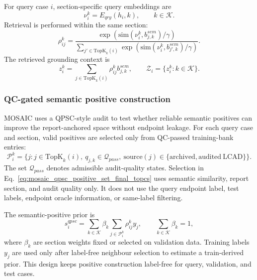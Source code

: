 For query case $i$, section-specific query embeddings are
\begin{equation}
\nu_i^k=E_{qry}(h_i,k),
\qquad k\in\mathcal{K}.
\label{eq:mosaic_query_embedding_final_topcs}
\end{equation}
Retrieval is performed within the same section:
\begin{equation}
\rho_{ij}^{k}
=
\frac{\exp(\mathrm{sim}(\nu_i^k,b_{j,k}^{sem})/\gamma)}
{\sum_{j'\in\mathrm{TopK}_{k}(i)}
\exp(\mathrm{sim}(\nu_i^k,b_{j',k}^{sem})/\gamma)}.
\label{eq:mosaic_retrieval_weights_final_topcs}
\end{equation}
The retrieved grounding context is
\begin{equation}
z_i^k
=
\sum_{j\in\mathrm{TopK}_{k}(i)}
\rho_{ij}^{k}b_{j,k}^{sem},
\qquad
\mathcal{Z}_i=\{z_i^k:k\in\mathcal{K}\}.
\label{eq:mosaic_retrieved_context_final_topcs}
\end{equation}

\subsubsection{QC-gated semantic positive construction}
\label{subsubsec:qpsc_positive_final_topcs}

MOSAIC uses a QPSC-style audit to test whether reliable semantic positives can improve the report-anchored space without endpoint leakage. For each query case and section, valid positives are selected only from QC-passed training-bank entries:
\begin{equation}
\mathcal{P}_{i}^{k}
=
\{j:
j\in\mathrm{TopK}_{k}(i),\
q_{j,k}\in\mathcal{Q}_{pass},\
\mathrm{source}(j)\in\{\mathrm{archived},\mathrm{audited\ LCAD}\}\}.
\label{eq:mosaic_qpsc_positive_set_final_topcs}
\end{equation}
The set $\mathcal{Q}_{pass}$ denotes admissible audit-quality states. Selection in Eq.~\eqref{eq:mosaic_qpsc_positive_set_final_topcs} uses semantic similarity, report section, and audit quality only. It does not use the query endpoint label, test labels, endpoint oracle information, or same-label filtering.

The semantic-positive prior is
\begin{equation}
s_i^{qpsc}
=
\sum_{k\in\mathcal{K}}
\beta_k
\sum_{j\in\mathcal{P}_{i}^{k}}
\rho_{ij}^{k}y_j,
\qquad
\sum_{k\in\mathcal{K}}\beta_k=1,
\label{eq:mosaic_qpsc_prior_final_topcs}
\end{equation}
where $\beta_k$ are section weights fixed or selected on validation data. Training labels $y_j$ are used only after label-free neighbour selection to estimate a train-derived prior. This design keeps positive construction label-free for query, validation, and test cases.

